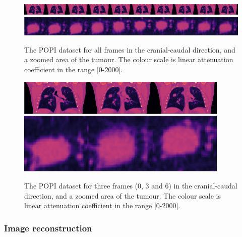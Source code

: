 \begin{figure}
\begin{center}

\includegraphics[width=\textwidth]{accuracyMC/imagerall.png} 
\includegraphics[width=\textwidth]{accuracyMC/tumourall.png} 


\end{center}

\caption[The whole 4D dataset in CC direction]{\label{fig:POPIfull} The POPI dataset for all frames in the cranial-caudal direction, and a zoomed area of the tumour.  The colour scale is linear attenuation coefficient in the range [0-2000].} 
\end{figure}
\begin{figure}
\begin{center}

\includegraphics[width=0.9\textwidth]{accuracyMC/imager3.png} 
\includegraphics[width=0.9\textwidth]{accuracyMC/tumour3.png} 


\end{center}

\caption[Three frames of the 4D dataset in CC direction]{\label{fig:POPI3} The POPI dataset for three frames (0, 3 and 6) in the cranial-caudal direction, and a zoomed area of the tumour.  The colour scale is linear attenuation coefficient in the range [0-2000].} 
\end{figure}

\subsubsection{Image reconstruction}

